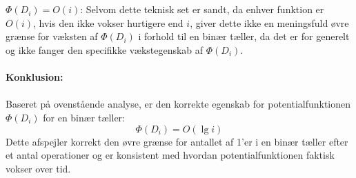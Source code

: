 \documentclass{article}
\begin{document}
\\
\\
$\Phi(D_i)=O(i)$: Selvom dette teknisk set er sandt, da enhver funktion er $O(i)$, hvis den ikke vokser hurtigere end $i$, giver dette ikke en meningsfuld øvre grænse for væksten af $\Phi(D_i)$ i forhold til en binær tæller, da det er for generelt og ikke fanger den specifikke vækstegenskab af $\Phi(D_i)$.
\\
\\
\textbf{Konklusion:}
\\
\\
Baseret på ovenstående analyse, er den korrekte egenskab for potentialfunktionen $\Phi(D_i)$ for en binær tæller:
$$\Phi(D_i)=O(\lg i)$$
Dette afspejler korrekt den øvre grænse for antallet af 1'er i en binær tæller efter et antal operationer og er konsistent med hvordan potentialfunktionen faktisk vokser over tid.
\end{document}
